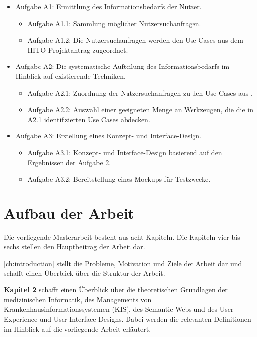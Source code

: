 \begin{itemize}
	\item Aufgabe A1: Ermittlung des Informationsbedarfs der Nutzer.
		\begin{itemize}
		\item Aufgabe A1.1: Sammlung möglicher Nutzersuchanfragen.
		\item Aufgabe A1.2: Die Nutzersuchanfragen werden den Use Cases aus dem HITO-Projektantrag zugeordnet.
		\end{itemize}
	\item Aufgabe A2: Die systematische Aufteilung des Informationsbedarfs im Hinblick auf existierende Techniken.
		\begin{itemize}
		\item Aufgabe A2.1: Zuordnung der Nutzersuchanfragen zu den Use Cases aus \citet{linkeddatavisualization}.
		\item Aufgabe A2.2: Auswahl einer geeigneten Menge an Werkzeugen, die die in A2.1 identifizierten Use Cases abdecken.
		\end{itemize}
	\item Aufgabe A3: Erstellung eines Konzept- und Interface-Design.
		\begin{itemize}
		\item Aufgabe A3.1: Konzept- und Interface-Design basierend auf den Ergebnissen der Aufgabe 2.
		\item Aufgabe A3.2: Bereitstellung eines Mockups für Testzwecke.
		\end{itemize}
\end{itemize}

\section{Aufbau der Arbeit}\label{sec:aufbau}

Die vorliegende Masterarbeit besteht aus acht Kapiteln. Die Kapiteln vier bis sechs stellen den Hauptbeitrag der Arbeit dar. \newline

\cref{ch:introduction} stellt die Probleme, Motivation und Ziele der Arbeit dar und schafft einen Überblick über die Struktur der Arbeit. \newline

\textbf{Kapitel 2} schafft einen Überblick über die theoretischen Grundlagen der medizinischen Informatik, des Managements von Krankenhausinformationssystemen (KIS), des Semantic Webs und des User-Experience und User Interface Designs. Dabei werden die relevanten Definitionen im Hinblick auf die vorliegende Arbeit erläutert.  \newline

